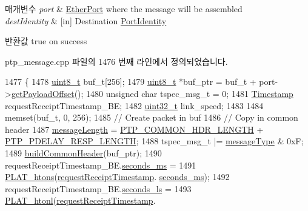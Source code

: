 \begin{DoxyParams}{매개변수}
{\em port} & \hyperlink{class_ether_port}{Ether\+Port} where the message will be assembled \\
\hline
{\em dest\+Identity} & \mbox{[}in\mbox{]} Destination \hyperlink{class_port_identity}{Port\+Identity} \\
\hline
\end{DoxyParams}
\begin{DoxyReturn}{반환값}
true on success 
\end{DoxyReturn}


ptp\+\_\+message.\+cpp 파일의 1476 번째 라인에서 정의되었습니다.


\begin{DoxyCode}
1477 \{
1478     \hyperlink{stdint_8h_aba7bc1797add20fe3efdf37ced1182c5}{uint8\_t} buf\_t[256];
1479     \hyperlink{stdint_8h_aba7bc1797add20fe3efdf37ced1182c5}{uint8\_t} *buf\_ptr = buf\_t + port->\hyperlink{class_common_port_a2697fd0fc7139659877b76cd1b022d44}{getPayloadOffset}();
1480     \textcolor{keywordtype}{unsigned} \textcolor{keywordtype}{char} tspec\_msg\_t = 0;
1481     \hyperlink{class_timestamp}{Timestamp} requestReceiptTimestamp\_BE;
1482     \hyperlink{parse_8c_a6eb1e68cc391dd753bc8ce896dbb8315}{uint32\_t} link\_speed;
1483 
1484     memset(buf\_t, 0, 256);
1485     \textcolor{comment}{// Create packet in buf}
1486     \textcolor{comment}{// Copy in common header}
1487     \hyperlink{class_p_t_p_message_common_a6c490faee54bca860c4d897aae50990f}{messageLength} = \hyperlink{avbts__message_8hpp_a8ec4d965b7b1e83844f1c17f12e9b8e4}{PTP\_COMMON\_HDR\_LENGTH} + 
      \hyperlink{avbts__message_8hpp_ac0ec5cb983cc66ad538676830d3fb8a4}{PTP\_PDELAY\_RESP\_LENGTH};
1488     tspec\_msg\_t |= \hyperlink{class_p_t_p_message_common_adb32627aa5b0e2dbad3ccd88aab07c05}{messageType} & 0xF;
1489     \hyperlink{class_p_t_p_message_common_a66c6d7a38fc74d84b68e13216c82a4e6}{buildCommonHeader}(buf\_ptr);
1490     requestReceiptTimestamp\_BE.\hyperlink{class_timestamp_a5d98378d782519e6f9c17db70f1620f0}{seconds\_ms} =
1491         \hyperlink{linux_2src_2platform_8cpp_aa89fc0aa7465274c200da69771d2a043}{PLAT\_htons}(\hyperlink{class_p_t_p_message_path_delay_resp_a981c3fe148ecddf9f1091675650ccd48}{requestReceiptTimestamp}.
      \hyperlink{class_timestamp_a5d98378d782519e6f9c17db70f1620f0}{seconds\_ms});
1492     requestReceiptTimestamp\_BE.\hyperlink{class_timestamp_a2bf200e58cd268d8b86cf93c51500a44}{seconds\_ls} =
1493         \hyperlink{linux_2src_2platform_8cpp_a8bf9e45ac3e41441f0e139139241c19d}{PLAT\_htonl}(\hyperlink{class_p_t_p_message_path_delay_resp_a981c3fe148ecddf9f1091675650ccd48}{requestReceiptTimestamp}.

\end{DoxyCode}
